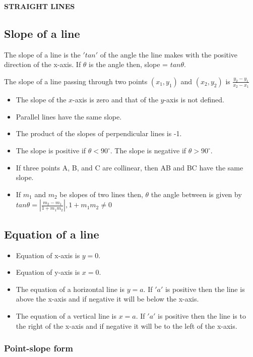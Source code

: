\documentclass[12pt]{article}
\begin{document}
\begin{center}
    {\LARGE \textbf{STRAIGHT LINES} }
\end{center}

\begin{multicols}{2}

\subsection*{Slope of a line }
The slope of a line is the $'tan'$ of the angle the line makes with the positive direction of the x-axis. If $\theta$ is the angle then, slope = $tan \theta$.

The slope of a line passing through two points $(x_1, y_1)$ and $(x_2, y_2)$ is $\frac{y_2 -y_1}{x_2 -x_1}$
\begin{itemize}
    \item The slope of the $x$-axis is zero and that of the $y$-axis is not defined.
    \item Parallel lines have the same slope.
    \item The product of the slopes of perpendicular lines is -1.
    \item The slope is positive if $\theta < 90^{\circ}$. The slope is negative if $\theta > 90^{\circ}$.
    \item If three points A, B, and C are collinear, then AB and BC have the same slope.
    \item If $m_1$ and $m_2$ be slopes of two lines then, $\theta$ the angle between is given by $tan \theta =|\frac{m_2-m_1}{1+m_1m_2}|, 1+m_1m_2 \not =0$
\end{itemize}
\subsection*{Equation of a line}
\begin{itemize}
    \item Equation of x-axis is $y = 0$.
    \item Equation of y-axis is $x = 0$.
    \item The equation of a horizontal line is $y = a$. If $'a'$ is positive then the line is above the x-axis and if negative it will be below the x-axis.
    \item The equation of a vertical line is $x = a$. If $'a'$ is positive then the line is to the right of the x-axis and if negative it will be to the left of the x-axis.
\end{itemize}
\subsubsection*{Point-slope form }


\end{multicols}
\end{document}
